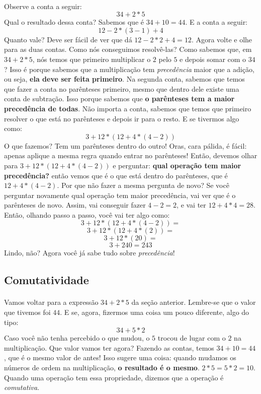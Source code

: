 \documentclass[12pt]{article}
\begin{document}
\paragraph{}
Observe a conta a seguir:
\begin{equation}
34 + 2*5
\end{equation}
Qual o resultado dessa conta? Sabemos que é $34 + 10 = 44$. E a conta 
a seguir: 
\begin{equation}
12 - 2*(3 - 1) + 4
\end{equation}
Quanto vale? Deve ser fácil de ver que dá $12 - 2*2 + 4 = 12$. Agora volte e 
olhe para as duas contas. Como nós conseguimos resolvê-las? Como sabemos que, em
$34 + 2*5$, nós temos que primeiro multiplicar o $2$ pelo $5$ e depois somar com
o $34$? Isso é porque sabemos que a multiplicação tem \textit{precedência} maior
que a adição, ou seja, \textbf{ela deve ser feita primeiro}. Na segunda conta,
sabemos que temos que fazer a conta no parênteses primeiro, mesmo que dentro
dele existe uma conta de subtração. Isso porque sabemos que \textbf{o parênteses
tem a maior precedência de todas}. Não importa a conta, sabemos que temos que 
primeiro resolver o que está no parênteses e depois ir para o resto. 
E se tivermos algo como:
$$3 + 12*(12 + 4*(4 - 2))$$
O que fazemos? Tem um parênteses dentro do outro! Oras, cara pálida, é fácil:
apenas aplique a mesma regra quando entrar no parênteses! Então, devemos olhar
para $3 + 12*(12 + 4*(4 - 2))$ e perguntar: \textbf{qual operação tem maior 
precedência?} então vemos que é o que está dentro do parênteses, que é 
$12 + 4*(4 - 2)$. Por que não fazer a mesma pergunta de novo? Se você perguntar
novamente qual operação tem maior precedência, vai ver que é o parênteses de 
novo. Assim, vai conseguir fazer $4 - 2 = 2$, e vai ter $12 + 4*4 = 28$. Então,
olhando passo a passo, você vai ter algo como:
$$3 + 12*(12 + 4*(4 - 2)) =$$
$$3 + 12*(12 + 4*(2)) =$$
$$3 + 12*(20) =$$
$$3 + 240 = 243$$
Lindo, não? Agora você já sabe tudo sobre \textit{precedência}!

\subsection{Comutatividade}
\paragraph{}
Vamos voltar para a expressão $34 + 2*5$ da seção anterior. Lembre-se que o 
valor que tivemos foi $44$. E se, agora, fizermos uma coisa um pouco diferente,
algo do tipo:
$$34 + 5*2$$
Caso você não tenha percebido o que mudou, o $5$ trocou de lugar com o $2$ na 
multiplicação. Que valor vamos ter agora? Fazendo as contas, temos 
$34 + 10 = 44$, que é o mesmo valor de antes! Isso sugere uma coisa: quando 
mudamos os números de ordem na multiplicação, \textbf{o resultado é o mesmo}.
$2*5 = 5*2 = 10$. Quando uma operação tem essa propriedade, dizemos que a 
operação é \textit{comutativa}. 
\end{document}

